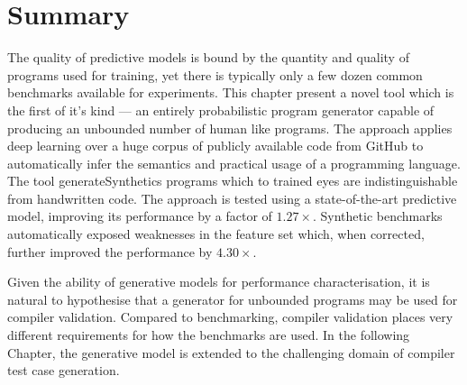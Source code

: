 \section{Summary}%
\label{sec:clgen-conclusion}

The quality of predictive models is bound by the quantity and quality of programs used for training, yet there is typically only a few dozen common benchmarks available for experiments. This chapter present a novel tool which is the first of it's kind --- an entirely probabilistic program generator capable of producing an unbounded number of human like programs. The approach applies deep learning over a huge corpus of publicly available code from GitHub to automatically infer the semantics and practical usage of a programming language. The tool generateSynthetics programs which to trained eyes are indistinguishable from handwritten code. The approach is tested using a state-of-the-art predictive model, improving its performance by a factor of $1.27\times$. Synthetic benchmarks automatically exposed weaknesses in the feature set which, when corrected, further improved the performance by $4.30\times$.

Given the ability of generative models for performance characterisation, it is natural to hypothesise that a generator for unbounded programs may be used for compiler validation. Compared to benchmarking, compiler validation places very different requirements for how the benchmarks are used. In the following Chapter, the generative model is extended to the challenging domain of compiler test case generation.

